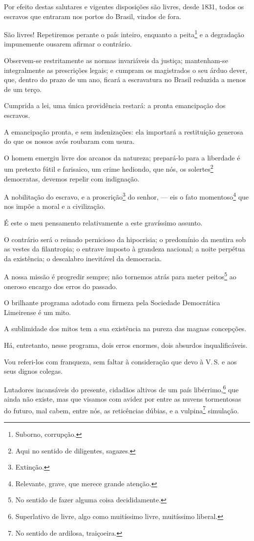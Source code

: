 Por efeito destas salutares e vigentes disposições são livres, desde
1831, todos os escravos que entraram nos portos do Brasil, vindos de
fora.

São livres! Repetiremos perante o país inteiro, enquanto a
peita\footnote{Suborno, corrupção.} e a degradação impunemente ousarem
afirmar o contrário.

Observem-se restritamente as normas invariáveis da justiça; mantenham-se
integralmente as prescrições legais; e cumpram os magistrados o seu
árduo dever, que, dentro do prazo de um ano, ficará a escravatura no
Brasil reduzida a menos de um terço.

Cumprida a lei, uma única providência restará: a pronta emancipação dos
escravos.

A emancipação pronta, e sem indenizações: ela importará a restituição
generosa do que os nossos avós roubaram com usura.

O homem emergiu livre dos arcanos da natureza; prepará-lo para a
liberdade é um pretexto fútil e farisaico, um crime hediondo, que nós,
os solertes\footnote{Aqui no sentido de diligentes, sagazes.}
democratas, devemos repelir com indignação.

A nobilitação do escravo, e a proscrição\footnote{Extinção.} do
senhor, --- eis o fato momentoso\footnote{Relevante, grave, que merece
  grande atenção.} que nos impõe a moral e a civilização.

É este o meu pensamento relativamente a este gravíssimo assunto.

O contrário será o reinado pernicioso da hipocrisia; o predomínio da
mentira sob as vestes da filantropia; o entrave imposto à grandeza
nacional; a noite perpétua da existência; o descalabro inevitável da
democracia.

A nossa missão é progredir sempre; não tornemos atrás para meter
peitos\footnote{No sentido de fazer alguma coisa decididamente.} ao
oneroso encargo dos erros do passado.

O brilhante programa adotado com firmeza pela Sociedade Democrática
Limeirense é um mito.

A sublimidade dos mitos tem a sua existência na pureza das magnas
concepções.

Há, entretanto, nesse programa, dois erros enormes, dois absurdos
inqualificáveis.

Vou referi-los com franqueza, sem faltar à consideração que devo à V.\,S.
e aos seus dignos colegas.

Lutadores incansáveis do presente, cidadãos altivos de um país
libérrimo,\footnote{Superlativo de livre, algo como muitíssimo livre,
  muitíssimo liberal.} que ainda não existe, mas que visamos com avidez
por entre as nuvens tormentosas do futuro, mal cabem, entre nós, as
reticências dúbias, e a vulpina\footnote{No sentido de ardilosa,
  traiçoeira.} simulação.

